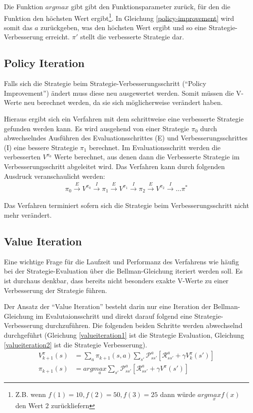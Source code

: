 \documentclass[10pt]{scrartcl}
\begin{document}
Die Funktion $argmax$ gibt gibt den Funktionsparameter zurück, für den die Funktion den höchsten Wert ergibt\footnote{Z.B. wenn $f(1)=10, f(2) = 50, f(3) = 25$ dann würde $arg\underset{x}{max}f(x)$ den Wert $2$ zurückliefern}. In Gleichung \ref{policy-improvement} wird somit das $a$ zurückgeben, was den höchsten Wert ergibt und so eine Strategie-Verbesserung erreicht. $\pi'$ stellt die verbesserte Strategie dar.

\subsection{Policy Iteration}
Falls sich die Strategie beim Strategie-Verbesserungsschritt (``Policy Improvement'') ändert muss diese neu ausgewertet werden. Somit müssen die V-Werte neu berechnet werden, da sie sich möglicherweise verändert haben.

Hieraus ergibt sich ein Verfahren mit dem schrittweise eine verbesserte Strategie gefunden werden kann. Es wird ausgehend von einer Strategie $\pi_0$ durch abwechselndes Ausführen des Evaluationsschrittes (E) und Verbesserungsschrittes (I) eine bessere Strategie $\pi_1$ berechnet. Im Evaluationsschritt werden die verbesserten $V^{\pi_0}$ Werte berechnet, aus denen dann die Verbesserte Strategie im Verbesserungsschritt abgeleitet wird. Das Verfahren kann durch  folgenden Ausdruck veranschaulicht werden:
\begin{align}
\pi_0 \overset{E}{\longrightarrow} V^{\pi_0} \overset{I}{\longrightarrow} \pi_1 \overset{E}{\longrightarrow} V^{\pi_1} \overset{I}{\longrightarrow} \pi_2  \overset{E}{\longrightarrow} V^{\pi_2} \overset{I}{\longrightarrow} ... \pi^*
\end{align}

Das Verfahren terminiert sofern sich die Strategie beim Verbesserungsschritt nicht mehr verändert.

\subsection{Value Iteration}
Eine wichtige Frage für die Laufzeit und Performanz des Verfahrens wie häufig bei der Strategie-Evaluation über die Bellman-Gleichung iteriert werden soll. Es ist durchaus denkbar, dass bereits nicht besonders exakte V-Werte zu einer Verbesserung der Strategie führen.

Der Ansatz der ``Value Iteration'' besteht darin nur eine Iteration der Bellman-Gleichung im Evalutaionsschritt und direkt darauf folgend eine Strategie-Verbesserung durchzuführen.
Die folgenden beiden Schritte werden abwechselnd durchgeführt (Gleichung \ref{valueiteration1} ist die Strategie Evaluation, Gleichung \ref{valueiteration2} ist die Strategie Verbesserung).
\begin{align}\label{valueiteration1}
V^\pi_{k+1}(s) &= \sum\limits_{a} \pi_{k+1}(s,a) \sum\limits_{s'}\mathcal{P}^a_{ss'}[\mathcal{R}^a_{ss'}+\gamma V^\pi_k(s')]\\
\pi_{k+1}(s) &= arg\underset{a}{max}\sum_{s'}\mathcal{P}^a_{ss'}[\mathcal{R}^a_{ss'}+\gamma V^\pi(s')]\label{valueiteration2}
\end{align}
\end{document}
